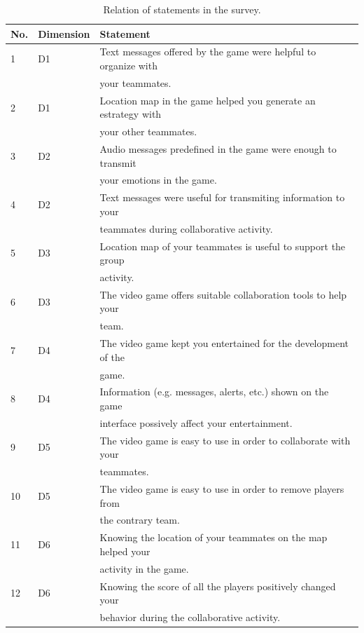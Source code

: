 \documentclass[conference]{./sty/IEEEtran}
\newcommand{\head}[1]{\textnormal{\textbf{#1}}}
\begin{document}
\begin{table}[htbp]
\renewcommand{\arraystretch}{1.2}
	\centering
		\begin{tabular}{|l|l|l|}
			\hline
		 	\head{No.} & \head{Dimension}	& \head{Statement} \\
			\hline
			1&D1&Text messages offered by the game were helpful to organize with\\
			& & your teammates. \\ \hline 
			2&D1&Location map in the game helped you generate an estrategy with \\
			&&your other teammates. \\  \hline
			3&D2&Audio messages predefined in the game were enough to transmit \\ 
			&&your emotions in the game. \\  \hline
			4&D2&Text messages were useful for transmiting information to your \\
			&&teammates during collaborative activity. \\  \hline
			5&D3&Location map of your teammates is useful to support the group \\
			&& activity. \\ \hline
			6&D3&The video game offers suitable collaboration tools to help your \\
			&&team. \\ \hline 
			7&D4&The video game kept you entertained for the development of the \\
			&&game. \\\hline 
			8&D4&Information (e.g. messages, alerts, etc.) shown on the game  \\
			&&interface possively affect your entertainment. \\ \hline 
			9&D5&The video game is easy to use in order to collaborate with your \\
			&&teammates. \\ \hline
			10&D5&The video game is easy to use in order to remove players from \\ 
			&&the contrary team. \\  \hline
			11&D6&Knowing the location of your teammates on the map helped your \\
			&&activity in the game. \\ \hline 
			12&D6&Knowing the score of all the players positively changed your \\
			&&behavior during the collaborative activity. \\ \hline
		\end{tabular}
	\caption{Relation of statements in the survey.}
	\label{tab:RelationOfStatementsInTheSurvey}
\end{table}
\end{document}
